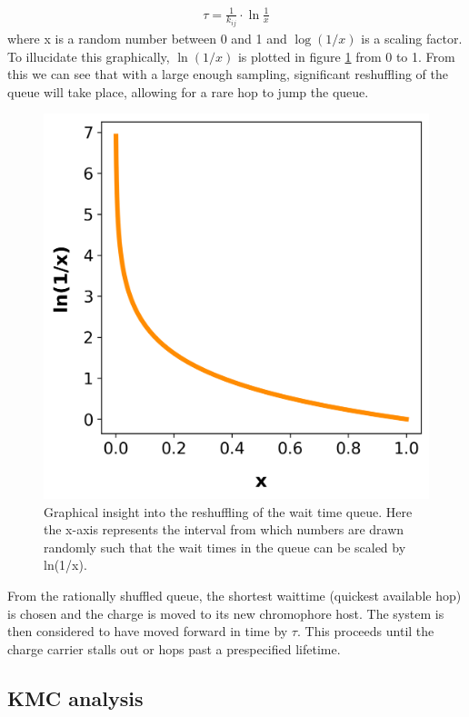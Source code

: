 \begin{align}
    \tau = \frac{1}{k_{ij}} \cdot \ln{\frac{1}{x}} 
\end{align}
where x is a random number between 0 and 1 and $\log{(1/x)}$ is a scaling factor. To illucidate this
graphically, $\ln{(1/x)}$ is plotted in figure \ref{fig:ln} from 0 to 1. From this we can see that with
a large enough sampling, significant reshuffling of the queue will take place, allowing for a rare hop to jump
the queue.

\begin{figure}
  \center
  \includegraphics[width=0.8\linewidth]{figures/naturallog.png}
  \caption{Graphical insight into the reshuffling of the wait time queue. Here the x-axis represents the 
    interval from which numbers are drawn randomly such that the wait times in the queue can be scaled 
    by ln(1/x).}
  \label{fig:ln}
\end{figure}

From the rationally shuffled queue, the shortest waittime (quickest available hop) is chosen and the charge is moved to
its new chromophore host. The system is then considered to have moved forward in time by $\tau$. This proceeds
until the charge carrier stalls out or hops past a prespecified lifetime. 



\subsection{KMC analysis}

